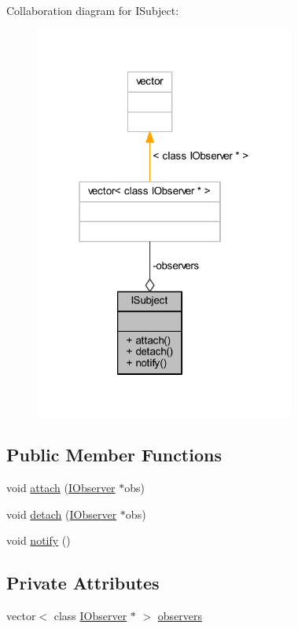 Collaboration diagram for I\+Subject\+:
\nopagebreak
\begin{figure}[H]
\begin{center}
\leavevmode
\includegraphics[width=242pt]{class_i_subject__coll__graph}
\end{center}
\end{figure}
\subsection*{Public Member Functions}
\begin{DoxyCompactItemize}
\item 
void \hyperlink{class_i_subject_a733819965718355910b31a0cf483111a}{attach} (\hyperlink{class_i_observer}{I\+Observer} $\ast$obs)
\item 
void \hyperlink{class_i_subject_a1c3f15d17acd8d4a7794c4e5e73fab18}{detach} (\hyperlink{class_i_observer}{I\+Observer} $\ast$obs)
\item 
void \hyperlink{class_i_subject_aeca49889b533c48cfbc66809b52a72c1}{notify} ()
\end{DoxyCompactItemize}
\subsection*{Private Attributes}
\begin{DoxyCompactItemize}
\item 
vector$<$ class \hyperlink{class_i_observer}{I\+Observer} $\ast$ $>$ \hyperlink{class_i_subject_a47f338e1ffa760b72fb19ccc3609d1f7}{observers}
\end{DoxyCompactItemize}



